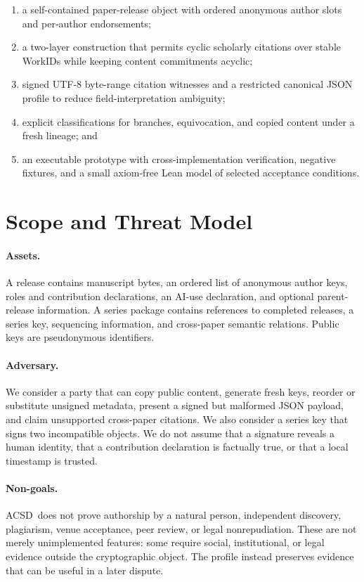 \documentclass[11pt]{article}
\newcommand{\workid}{\textsf{WorkID}}
\newcommand{\acsd}{\textsc{ACSD}}
\begin{document}
\begin{enumerate}
  \item a self-contained paper-release object with ordered anonymous author slots and per-author endorsements;
  \item a two-layer construction that permits cyclic scholarly citations over stable \workid s while keeping content commitments acyclic;
  \item signed UTF-8 byte-range citation witnesses and a restricted canonical JSON profile to reduce field-interpretation ambiguity;
  \item explicit classifications for branches, equivocation, and copied content under a fresh lineage; and
  \item an executable prototype with cross-implementation verification, negative fixtures, and a small axiom-free Lean model of selected acceptance conditions.
\end{enumerate}

\section{Scope and Threat Model}

\paragraph{Assets.} A release contains manuscript bytes, an ordered list of anonymous author keys, roles and contribution declarations, an AI-use declaration, and optional parent-release information. A series package contains references to completed releases, a series key, sequencing information, and cross-paper semantic relations. Public keys are pseudonymous identifiers.

\paragraph{Adversary.} We consider a party that can copy public content, generate fresh keys, reorder or substitute unsigned metadata, present a signed but malformed JSON payload, and claim unsupported cross-paper citations. We also consider a series key that signs two incompatible objects. We do not assume that a signature reveals a human identity, that a contribution declaration is factually true, or that a local timestamp is trusted.

\paragraph{Non-goals.} \acsd\ does not prove authorship by a natural person, independent discovery, plagiarism, venue acceptance, peer review, or legal nonrepudiation. These are not merely unimplemented features: some require social, institutional, or legal evidence outside the cryptographic object. The profile instead preserves evidence that can be useful in a later dispute.
\end{document}
